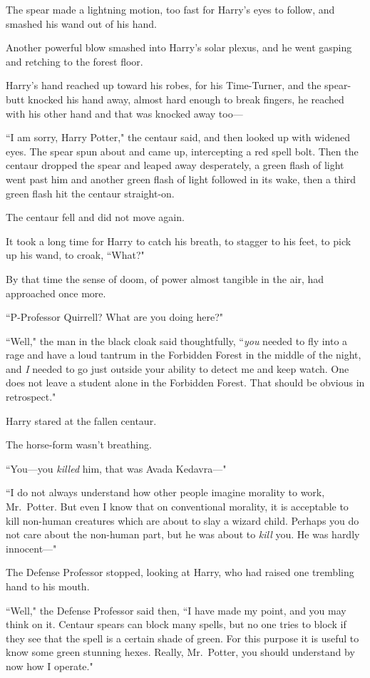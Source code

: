 The spear made a lightning motion, too fast for Harry's eyes to follow, and smashed his wand out of his hand.

Another powerful blow smashed into Harry's solar plexus, and he went gasping and retching to the forest floor.

Harry's hand reached up toward his robes, for his Time-Turner, and the spear-butt knocked his hand away, almost hard enough to break fingers, he reached with his other hand and that was knocked away too—

``I am sorry, Harry Potter," the centaur said, and then looked up with widened eyes. The spear spun about and came up, intercepting a red spell bolt. Then the centaur dropped the spear and leaped away desperately, a green flash of light went past him and another green flash of light followed in its wake, then a third green flash hit the centaur straight-on.

The centaur fell and did not move again.

It took a long time for Harry to catch his breath, to stagger to his feet, to pick up his wand, to croak, ``What?"

By that time the sense of doom, of power almost tangible in the air, had approached once more.

``P-Professor Quirrell? What are you doing here?"

``Well," the man in the black cloak said thoughtfully, ``\emph{you} needed to fly into a rage and have a loud tantrum in the Forbidden Forest in the middle of the night, and \emph{I} needed to go just outside your ability to detect me and keep watch. One does not leave a student alone in the Forbidden Forest. That should be obvious in retrospect."

Harry stared at the fallen centaur.

The horse-form wasn't breathing.

``You—you \emph{killed} him, that was Avada Kedavra—"

``I do not always understand how other people imagine morality to work, Mr.~Potter. But even I know that on conventional morality, it is acceptable to kill non-human creatures which are about to slay a wizard child. Perhaps you do not care about the non-human part, but he was about to \emph{kill} you. He was hardly innocent—"

The Defense Professor stopped, looking at Harry, who had raised one trembling hand to his mouth.

``Well," the Defense Professor said then, ``I have made my point, and you may think on it. Centaur spears can block many spells, but no one tries to block if they see that the spell is a certain shade of green. For this purpose it is useful to know some green stunning hexes. Really, Mr.~Potter, you should understand by now how I operate."

